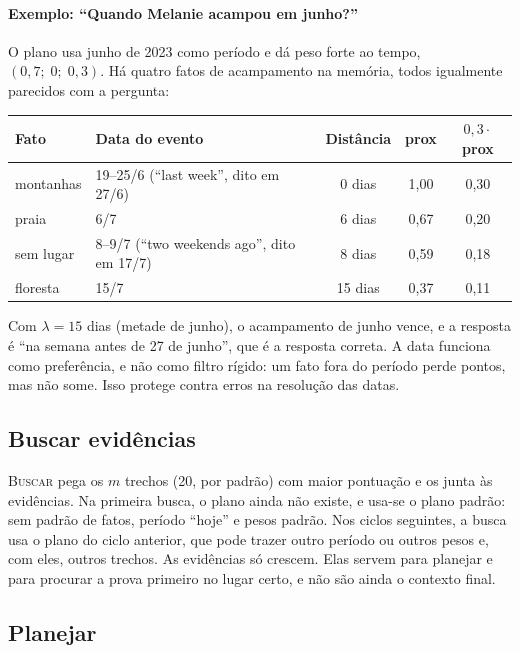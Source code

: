 \documentclass[11pt]{article}
\newcommand{\op}[1]{\textsc{#1}}
\begin{document}
\paragraph{Exemplo: ``Quando Melanie acampou em junho?''} O plano usa junho
de 2023 como período e dá peso forte ao tempo, $(0{,}7;\;0;\;0{,}3)$. Há quatro
fatos de acampamento na memória, todos igualmente parecidos com a pergunta:
\begin{center}
\small
\begin{tabular}{@{}l l c c c@{}}
\toprule
Fato & Data do evento & Distância & prox & $0{,}3\cdot$prox \\
\midrule
montanhas & 19--25/6 (``last week'', dito em 27/6) & 0 dias & 1,00 & 0,30 \\
praia & 6/7 & 6 dias & 0,67 & 0,20 \\
sem lugar & 8--9/7 (``two weekends ago'', dito em 17/7) & 8 dias & 0,59 & 0,18 \\
floresta & 15/7 & 15 dias & 0,37 & 0,11 \\
\bottomrule
\end{tabular}
\end{center}
Com $\lambda=15$ dias (metade de junho), o acampamento de junho vence, e a
resposta é ``na semana antes de 27 de junho'', que é a resposta correta. A
data funciona como preferência, e não como filtro rígido: um fato fora do
período perde pontos, mas não some. Isso protege contra erros na resolução
das datas.

\subsection{Buscar evidências}

\op{Buscar} pega os $m$ trechos (20, por padrão) com maior pontuação e os
junta às evidências. Na primeira busca, o plano ainda não existe, e usa-se o
plano padrão: sem padrão de fatos, período ``hoje'' e pesos padrão. Nos ciclos
seguintes, a busca usa o plano do ciclo anterior, que pode trazer outro
período ou outros pesos e, com eles, outros trechos. As evidências só
crescem. Elas servem para planejar e para procurar a prova primeiro no lugar
certo, e não são ainda o contexto final.

\subsection{Planejar}
\end{document}
